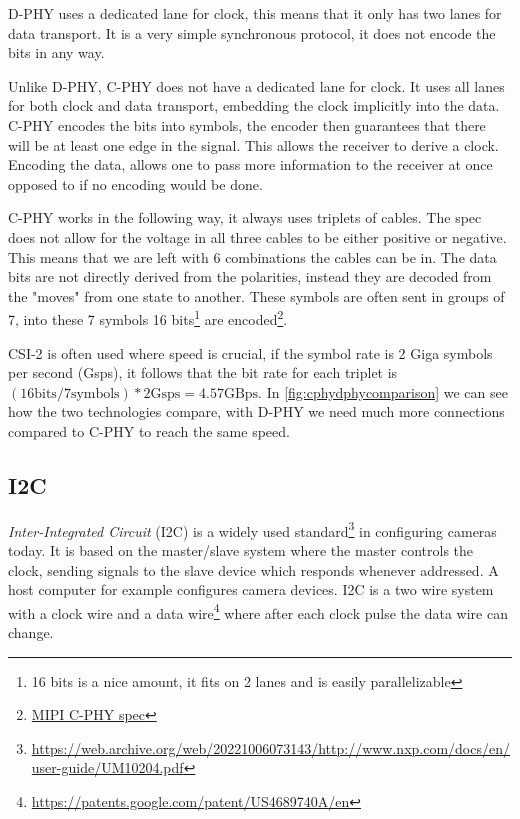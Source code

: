 D-PHY uses a dedicated lane for clock, this means that it only has two lanes for
data transport. It is a very simple synchronous protocol, it does not encode the
bits in any way.

Unlike D-PHY, C-PHY does not have a dedicated lane for clock. It uses all lanes
for both clock and data transport, embedding the clock implicitly into the
data. C-PHY encodes the bits into symbols, the encoder then guarantees that
there will be at least one edge in the signal. This allows the receiver to
derive a clock. Encoding the data, allows one to pass more information to the
receiver at once opposed to if no encoding would be done.

C-PHY works in the following way, it always uses triplets of cables. The spec
does not allow for the voltage in all three cables to be either positive or
negative. This means that we are left with 6 combinations the cables can be in.
The data bits are not directly derived from the polarities, instead they are
decoded from the "moves" from one state to another. These symbols are often
sent in groups of 7, into these 7 symbols 16 bits\footnote{16 bits is a nice
amount, it fits on 2 lanes and is easily parallelizable} are encoded\footnote{\href{https://www.mipi.org/specifications/c-phy}{MIPI C-PHY spec}}.

CSI-2 is often used where speed is crucial, if the symbol rate is 2 Giga symbols per second (Gsps),
it follows that the bit rate for each triplet is
$(16\text{bits} / 7\text{symbols}) * 2\text{Gsps} = 4.57 \text{GBps}$.
In \cref{fig:cphydphycomparison} we can see how the two technologies compare,
with D-PHY we need much more connections compared to C-PHY to reach the same
speed.

\subsection{I2C}
\textit{Inter-Integrated Circuit} (I2C) is a widely used standard\footnote{\href{http://www.nxp.com/docs/en/user-guide/UM10204.pdf}{https://web.archive.org/web/20221006073143/http://www.nxp.com/docs/en/user-guide/UM10204.pdf}}
in configuring cameras today. It is based on the
master/slave system where the master controls the clock, sending signals to the
slave device which responds whenever addressed. A host computer for example
configures camera devices. I2C is a two wire system with a clock wire and a
data wire\footnote{\href{https://patents.google.com/patent/US4689740A/en}{https://patents.google.com/patent/US4689740A/en}}
where after each clock pulse the data wire can change.

